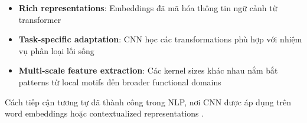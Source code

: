 \begin{itemize}
    \item \textbf{Rich representations}: Embeddings đã mã hóa thông tin ngữ cảnh từ transformer
    \item \textbf{Task-specific adaptation}: CNN học các transformations phù hợp với nhiệm vụ phân loại lối sống
    \item \textbf{Multi-scale feature extraction}: Các kernel sizes khác nhau nắm bắt patterns từ local motifs đến broader functional domains
\end{itemize}

Cách tiếp cận tương tự đã thành công trong NLP, nơi CNN được áp dụng trên word embeddings hoặc contextualized representations \cite{kim2014convolutional,johnson2017deep}.
